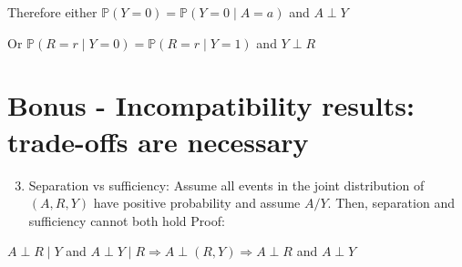 \documentclass[10pt]{article}
\begin{document}
Therefore either $\mathbb{P}(Y=0)=\mathbb{P}(Y=0 \mid A=a)$ and $A \perp Y$

Or $\mathbb{P}(R=r \mid Y=0)=\mathbb{P}(R=r \mid Y=1)$ and $Y \perp R$

\section*{Bonus - Incompatibility results: trade-offs are necessary}
\begin{enumerate}
  \setcounter{enumi}{2}
  \item Separation vs sufficiency: Assume all events in the joint distribution of $(A, R, Y)$ have positive probability and assume $A / Y$. Then, separation and sufficiency cannot both hold Proof:
\end{enumerate}

$A \perp R \mid Y$ and $A \perp Y \mid R \Longrightarrow A \perp(R, Y) \Longrightarrow A \perp R$ and $A \perp Y$
\end{document}

